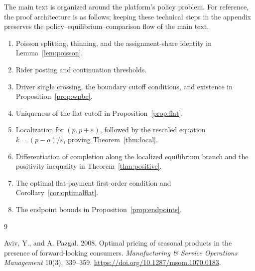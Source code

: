 \documentclass[11pt]{article}
\theoremstyle{definition}
\theoremstyle{remark}
\begin{document}
The main text is organized around the platform's policy problem.  For
reference, the proof architecture is as follows; keeping these technical steps
in the appendix preserves the policy--equilibrium--comparison flow of the main
text.

\begin{enumerate}[label=\textbf{A.\arabic*}]
  \item Poisson splitting, thinning, and the assignment-share identity in
        Lemma~\ref{lem:poisson}.
  \item Rider posting and continuation thresholds.
  \item Driver single crossing, the boundary cutoff conditions, and existence
        in Proposition~\ref{prop:wpbe}.
  \item Uniqueness of the flat cutoff in Proposition~\ref{prop:flat}.
  \item Localization for \((p,p+\varepsilon)\), followed by the rescaled
        equation \(k=(p-a)/\varepsilon\), proving
        Theorem~\ref{thm:local}.
  \item Differentiation of completion along the localized equilibrium branch
        and the positivity inequality in Theorem~\ref{thm:positive}.
  \item The optimal flat-payment first-order condition and
        Corollary~\ref{cor:optimalflat}.
  \item The endpoint bounds in Proposition~\ref{prop:endpoints}.
\end{enumerate}

\begin{thebibliography}{9}

Aviv, Y., and A. Pazgal. 2008.
Optimal pricing of seasonal products in the presence of forward-looking
consumers.
\emph{Manufacturing \& Service Operations Management} 10(3), 339--359.
\url{https://doi.org/10.1287/msom.1070.0183}.

\end{thebibliography}
\end{document}
